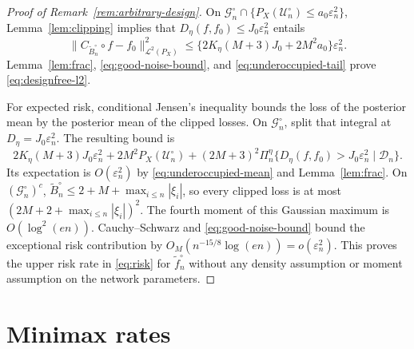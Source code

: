 \documentclass[11pt,a4paper]{article}
\theoremstyle{remark}
\newcommand{\Dcal}{\mathcal D}
\newcommand{\Lcal}{\mathcal L}
\newcommand{\norm}[1]{\lVert#1\rVert}
\begin{document}
\begin{proof}[Proof of Remark~\ref{rem:arbitrary-design}]
On $\mathcal G_n^{\circ}\cap
\{P_X(\mathcal U_n^{\circ})\leq a_0\varepsilon_n^2\}$,
Lemma~\ref{lem:clipping} implies that
$D_\eta(f,f_0)\leq J_0\varepsilon_n^2$ entails
\[
\norm{C_{\widetilde B_n^{\circ}}\circ f-f_0}_{\Lcal^2(P_X)}^2
\leq\{2K_\eta(M+3)J_0+2M^2a_0\}\varepsilon_n^2.
\]
Lemma~\ref{lem:frac}, \eqref{eq:good-noise-bound}, and
\eqref{eq:underoccupied-tail} prove \eqref{eq:designfree-l2}.

For expected risk, conditional Jensen's inequality bounds the loss
of the posterior mean by the posterior mean of the clipped losses.
On $\mathcal G_n^{\circ}$, split that integral at
$D_\eta=J_0\varepsilon_n^2$.
The resulting bound is
\[
2K_\eta(M+3)J_0\varepsilon_n^2
+2M^2P_X(\mathcal U_n^{\circ})
+(2M+3)^2\Pi_n^\eta
\{D_\eta(f,f_0)>J_0\varepsilon_n^2\mid\Dcal_n\}.
\]
Its expectation is $O(\varepsilon_n^2)$ by
\eqref{eq:underoccupied-mean} and Lemma~\ref{lem:frac}.
On $(\mathcal G_n^{\circ})^c$,
$\widetilde B_n^{\circ}\leq2+M+\max_{i\leq n}|\xi_i|$,
so every clipped loss is at most
$(2M+2+\max_{i\leq n}|\xi_i|)^2$.
The fourth moment of this Gaussian maximum is $O(\log^2(en))$.
Cauchy--Schwarz and \eqref{eq:good-noise-bound} bound the exceptional
risk contribution by $O_M(n^{-15/8}\log(en))=o(\varepsilon_n^2)$.
This proves the upper risk rate in \eqref{eq:risk} for
$\widetilde f_n^{\circ}$ without any density assumption or moment assumption on the network parameters.
\end{proof}
\endgroup

\section{Minimax rates}\label{app:minimax}
\end{document}
